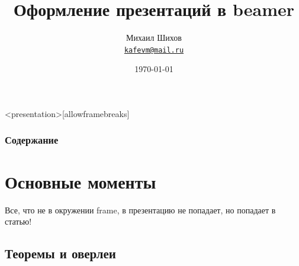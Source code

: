 

\usepackage[russian]{babel}
\usepackage[utf8]{inputenc}
\usepackage{graphicx}


\title[Презентации в beamer]{Оформление презентаций в beamer}
\date{\today}
\author[М.~М.~Шихов]{Михаил Шихов \\ \texttt{\underline{kafevm@mail.ru}}}






\begin{frame}<presentation>[allowframebreaks]
    \frametitle{Содержание}
    \tableofcontents
\end{frame}


\section{Основные моменты}

Все, что не в окружении frame, в презентацию не попадает, но попадает в статью!


\subsection{Теоремы и оверлеи}

